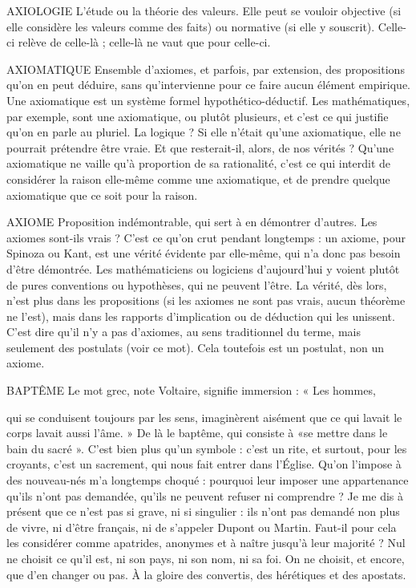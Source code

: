 AXIOLOGIE L'étude ou la théorie des valeurs. Elle peut se vouloir objective
(si elle considère les valeurs comme des faits) ou normative (si
elle y souscrit). Celle-ci relève de celle-là ; celle-là ne vaut que pour celle-ci.

AXIOMATIQUE Ensemble d’axiomes, et parfois, par extension, des propositions
qu’on en peut déduire, sans qu’intervienne pour ce
faire aucun élément empirique. Une axiomatique est un système formel hypothético-déductif.
Les mathématiques, par exemple, sont une axiomatique, ou
plutôt plusieurs, et c’est ce qui justifie qu’on en parle au pluriel. La logique ? Si
elle n’était qu’une axiomatique, elle ne pourrait prétendre être vraie. Et que resterait-il,
alors, de nos vérités ?
Qu’une axiomatique ne vaille qu’à proportion de sa rationalité, c’est ce qui
interdit de considérer la raison elle-même comme une axiomatique, et de
prendre quelque axiomatique que ce soit pour la raison.

AXIOME Proposition indémontrable, qui sert à en démontrer d’autres. Les
axiomes sont-ils vrais ? C’est ce qu’on crut pendant longtemps :
un axiome, pour Spinoza ou Kant, est une vérité évidente par elle-même, qui
n'a donc pas besoin d’être démontrée. Les mathématiciens ou logiciens
d’aujourd’hui y voient plutôt de pures conventions ou hypothèses, qui ne peuvent
l'être. La vérité, dès lors, n’est plus dans les propositions (si les axiomes ne
sont pas vrais, aucun théorème ne l’est), mais dans les rapports d’implication
ou de déduction qui les unissent. C’est dire qu’il n’y a pas d’axiomes, au sens
traditionnel du terme, mais seulement des postulats (voir ce mot). Cela toutefois
est un postulat, non un axiome.

BAPTÊME Le mot grec, note Voltaire, signifie immersion : « Les hommes,

qui se conduisent toujours par les sens, imaginèrent aisément que
ce qui lavait le corps lavait aussi l'âme. » De là le baptême, qui consiste à «se
mettre dans le bain du sacré ». C’est bien plus qu’un symbole : c’est un rite, et
surtout, pour les croyants, c’est un sacrement, qui nous fait entrer dans l’Église.
Qu'on l’impose à des nouveau-nés m’a longtemps choqué : pourquoi leur
imposer une appartenance qu’ils n’ont pas demandée, qu’ils ne peuvent refuser
ni comprendre ? Je me dis à présent que ce n’est pas si grave, ni si singulier : ils
n’ont pas demandé non plus de vivre, ni d’être français, ni de s'appeler Dupont
ou Martin. Faut-il pour cela les considérer comme apatrides, anonymes et à
naître jusqu’à leur majorité ? Nul ne choisit ce qu’il est, ni son pays, ni son
nom, ni sa foi. On ne choisit, et encore, que d’en changer ou pas. À la gloire
des convertis, des hérétiques et des apostats.


